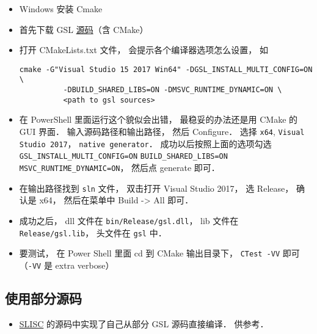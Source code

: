 \begin{itemize}
\item Windows 安装 Cmake
\item 首先下载 GSL \href{https://github.com/ampl/gsl}{源码}（含 CMake）
\item 打开 CMakeLists.txt 文件， 会提示各个编译器选项怎么设置， 如
\begin{lstlisting}[language=none]
    cmake -G"Visual Studio 15 2017 Win64" -DGSL_INSTALL_MULTI_CONFIG=ON \
          -DBUILD_SHARED_LIBS=ON -DMSVC_RUNTIME_DYNAMIC=ON \
          <path to gsl sources>
\end{lstlisting}
\item 在 PowerShell 里面运行这个貌似会出错， 最稳妥的办法还是用 CMake 的 GUI 界面． 输入源码路径和输出路径， 然后 Configure． 选择 \verb`x64`, \verb`Visual Studio 2017`， \verb`native generator`． 成功以后按照上面的选项勾选 \verb`GSL_INSTALL_MULTI_CONFIG=ON` \verb`BUILD_SHARED_LIBS=ON` \verb`MSVC_RUNTIME_DYNAMIC=ON`， 然后点 generate 即可．
\item 在输出路径找到 \verb`sln` 文件， 双击打开 Visual Studio 2017， 选 Release， 确认是 x64， 然后在菜单中 Build -> All 即可．

\item 成功之后， dll 文件在 \verb`bin/Release/gsl.dll`， lib 文件在 \verb`Release/gsl.lib`， 头文件在 \verb`gsl` 中．
\item 要测试， 在 Power Shell 里面 cd 到 CMake 输出目录下， \verb`CTest -VV` 即可 （\verb`-VV` 是 extra verbose）
\end{itemize}

\subsection{使用部分源码}
\begin{itemize}
\item \href{https://github.com/MacroUniverse/SLISC}{SLISC} 的源码中实现了自己从部分 GSL 源码直接编译． 供参考．
\end{itemize}
